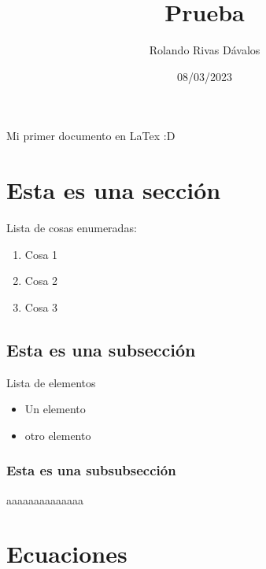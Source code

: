 \documentclass[11pt, letterpaper]{article}
\title{Prueba}
\author{Rolando Rivas Dávalos}
\date{08/03/2023}
\begin{document}
\maketitle
Mi primer documento en LaTex :D

\section{Esta es una sección}
Lista de cosas enumeradas:
\begin{enumerate}
    \item Cosa 1
    \item Cosa 2
    \item Cosa 3
\end{enumerate}
\subsection{Esta es una subsección}
Lista de elementos
\begin{itemize}
    \item Un elemento
    \item otro elemento
\end{itemize}
\subsubsection{Esta es una subsubsección}
aaaaaaaaaaaaaa

\section{Ecuaciones}
\end{document}

